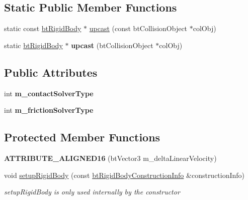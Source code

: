 \subsection*{Static Public Member Functions}
\begin{DoxyCompactItemize}
\item 
static const \hyperlink{classbt_rigid_body}{bt\+Rigid\+Body} $\ast$ \hyperlink{classbt_rigid_body_a59077fce3d2efd193a3fd7d7de2c97e8}{upcast} (const bt\+Collision\+Object $\ast$col\+Obj)
\item 
\hypertarget{classbt_rigid_body_a39c3becb4cec6c3c30359444f6f64420}{static \hyperlink{classbt_rigid_body}{bt\+Rigid\+Body} $\ast$ {\bfseries upcast} (bt\+Collision\+Object $\ast$col\+Obj)}\label{classbt_rigid_body_a39c3becb4cec6c3c30359444f6f64420}

\end{DoxyCompactItemize}
\subsection*{Public Attributes}
\begin{DoxyCompactItemize}
\item 
\hypertarget{classbt_rigid_body_a4673a548621e61ef66364a461ad21947}{int {\bfseries m\+\_\+contact\+Solver\+Type}}\label{classbt_rigid_body_a4673a548621e61ef66364a461ad21947}

\item 
\hypertarget{classbt_rigid_body_a322471bd51e8fd0a383a38a3611c7256}{int {\bfseries m\+\_\+friction\+Solver\+Type}}\label{classbt_rigid_body_a322471bd51e8fd0a383a38a3611c7256}

\end{DoxyCompactItemize}
\subsection*{Protected Member Functions}
\begin{DoxyCompactItemize}
\item 
\hypertarget{classbt_rigid_body_a2b1b5fe723354ad55c1412e52372b053}{{\bfseries A\+T\+T\+R\+I\+B\+U\+T\+E\+\_\+\+A\+L\+I\+G\+N\+E\+D16} (bt\+Vector3 m\+\_\+delta\+Linear\+Velocity)}\label{classbt_rigid_body_a2b1b5fe723354ad55c1412e52372b053}

\item 
\hypertarget{classbt_rigid_body_adaa57210b4f5388b63a11db376358dd0}{void \hyperlink{classbt_rigid_body_adaa57210b4f5388b63a11db376358dd0}{setup\+Rigid\+Body} (const \hyperlink{structbt_rigid_body_1_1bt_rigid_body_construction_info}{bt\+Rigid\+Body\+Construction\+Info} \&construction\+Info)}\label{classbt_rigid_body_adaa57210b4f5388b63a11db376358dd0}

\begin{DoxyCompactList}\small\item\em setup\+Rigid\+Body is only used internally by the constructor \end{DoxyCompactList}\end{DoxyCompactItemize}
